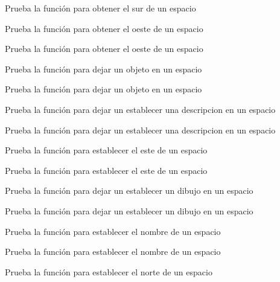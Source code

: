 \begin{DoxyRefList}
Prueba la función para obtener el sur de un espacio  
\item[\label{test__test000264}%
\Hypertarget{test__test000264}%
Member \hyperlink{space__test_8h_a1f08c6866885bfc093717f57b1b86539}{test1\+\_\+space\+\_\+get\+\_\+west} ()]Prueba la función para obtener el oeste de un espacio 

Prueba la función para obtener el oeste de un espacio  
\item[\label{test__test000268}%
\Hypertarget{test__test000268}%
Member \hyperlink{space__test_8h_aeaacecb0999daa6ec764aa79ceb2a1b6}{test1\+\_\+space\+\_\+leave\+\_\+object} ()]Prueba la función para dejar un objeto en un espacio 

Prueba la función para dejar un objeto en un espacio  
\item[\label{test__test000274}%
\Hypertarget{test__test000274}%
Member \hyperlink{space__test_8h_a19a1bac3ab9cc6f5bf7ea8c4a72392c4}{test1\+\_\+space\+\_\+set\+\_\+description} ()]Prueba la función para dejar un establecer una descripcion en un espacio 

Prueba la función para dejar un establecer una descripcion en un espacio  
\item[\label{test__test000249}%
\Hypertarget{test__test000249}%
Member \hyperlink{space__test_8h_ab1f093af4be3ca8e525d0517cc846f47}{test1\+\_\+space\+\_\+set\+\_\+east} ()]Prueba la función para establecer el este de un espacio 

Prueba la función para establecer el este de un espacio  
\item[\label{test__test000270}%
\Hypertarget{test__test000270}%
Member \hyperlink{space__test_8h_a068c22b91236896ae1b077a8f7059458}{test1\+\_\+space\+\_\+set\+\_\+gdesc} ()]Prueba la función para dejar un establecer un dibujo en un espacio 

Prueba la función para dejar un establecer un dibujo en un espacio  
\item[\label{test__test000242}%
\Hypertarget{test__test000242}%
Member \hyperlink{space__test_8h_a2569bab6cfeec15f722d232bb8c78c9e}{test1\+\_\+space\+\_\+set\+\_\+name} ()]Prueba la función para establecer el nombre de un espacio 

Prueba la función para establecer el nombre de un espacio  
\item[\label{test__test000245}%
\Hypertarget{test__test000245}%
Member \hyperlink{space__test_8h_a3d3457a89f705948102cf1e5d4a7b45b}{test1\+\_\+space\+\_\+set\+\_\+north} ()]Prueba la función para establecer el norte de un espacio 


\end{DoxyRefList}
